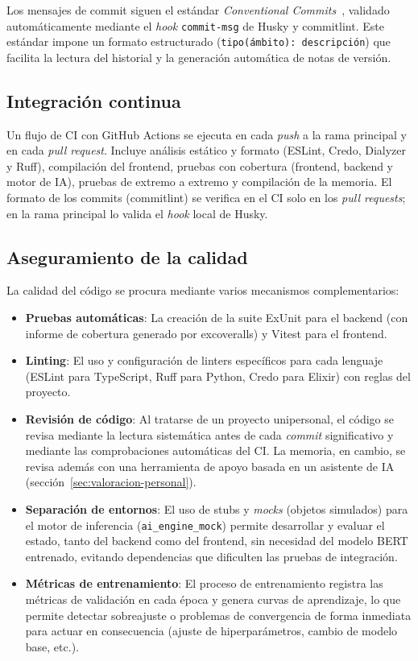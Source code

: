 Los mensajes de commit siguen el estándar \emph{Conventional Commits}~\cite{conventionalcommits2024}, validado automáticamente mediante el \emph{hook} \texttt{commit-msg} de Husky y commitlint. Este estándar impone un formato estructurado (\texttt{tipo(ámbito): descripción}) que facilita la lectura del historial y la generación automática de notas de versión.

\subsection{Integración continua}

Un flujo de CI con GitHub Actions se ejecuta en cada \emph{push} a la rama principal y en cada \emph{pull request}. Incluye análisis estático y formato (ESLint, Credo, Dialyzer y Ruff), compilación del frontend, pruebas con cobertura (frontend, backend y motor de IA), pruebas de extremo a extremo y compilación de la memoria. El formato de los commits (commitlint) se verifica en el CI solo en los \emph{pull requests}; en la rama principal lo valida el \emph{hook} local de Husky.

\subsection{Aseguramiento de la calidad}

La calidad del código se procura mediante varios mecanismos complementarios:

\begin{itemize}
 \item \textbf{Pruebas automáticas}: La creación de la suite ExUnit para el backend (con informe de cobertura generado por excoveralls) y Vitest para el frontend.
 \item \textbf{Linting}: El uso y configuración de linters específicos para cada lenguaje (ESLint para TypeScript, Ruff para Python, Credo para Elixir) con reglas del proyecto.
 \item \textbf{Revisión de código}: Al tratarse de un proyecto unipersonal, el código se revisa mediante la lectura sistemática antes de cada \emph{commit} significativo y mediante las comprobaciones automáticas del CI. La memoria, en cambio, se revisa además con una herramienta de apoyo basada en un asistente de IA (sección~\ref{sec:valoracion-personal}).
 \item \textbf{Separación de entornos}: El uso de stubs y \emph{mocks} (objetos simulados) para el motor de inferencia (\texttt{ai\_engine\_mock}) permite desarrollar y evaluar el estado, tanto del backend como del frontend, sin necesidad del modelo BERT entrenado, evitando dependencias que dificulten las pruebas de integración.
 \item \textbf{Métricas de entrenamiento}: El proceso de entrenamiento registra las métricas de validación en cada época y genera curvas de aprendizaje, lo que permite detectar sobreajuste o problemas de convergencia de forma inmediata para actuar en consecuencia (ajuste de hiperparámetros, cambio de modelo base, etc.).
\end{itemize}

